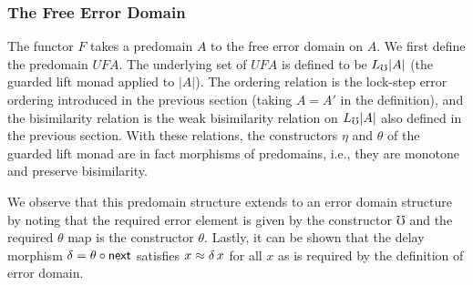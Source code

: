 \begin{comment}
    \inferrule*[right = DnClosed]
    {b_1' \le_{B_1} b_1 \and b_1 \mathbin{d \relcomp d'} b_3}
    {b_1' \mathbin{d \relcomp d'} b_3}

    \inferrule*[right = UpClosed]
    {b_1 \mathbin{d \relcomp d'} b_3 \and b_3 \le_{B_3} b_3'}
    {b_1 \mathbin{d \relcomp d'} b_3'}

    \inferrule*[right = PresErr]
    { }
    {\mho_{B_1} \mathbin{d \relcomp d'} b_3}

    \inferrule*[right = PresTheta]
    {\later_t( \tilde{b_1} \mathbin{d \relcomp d'} \tilde{b_3} ) }
    {\theta_{B_1}(\tilde{b_1}) \mathbin{d \relcomp d'} \theta_{B_3}(\tilde{b_3}) }
\end{mathpar}
%
%



We now describe the squares. Suppose we are given predomains $A_i, A_o, A_i'$,
and $A_o'$, relations $c_i : A_i \rel A_i'$ and $c_o : A_o \rel A_o'$, and
morphisms $f : A_i \to A_o, f' : A_i' \to A_o'$ Given a square with these
morphisms and relations, we say that the square commutes, written $f \le f'$, if
for all $x \in A_i$ and $x' \in A_i'$ with $(x, x') \in c_i$, we have $(f(x),
f'(x')) \in c_o$. We make the analogous definition for error domains.

\end{comment}

\subsubsection{The Free Error Domain}\label{sec:free-error-domain}

The functor $F$ takes a predomain $A$ to the free error domain on $A$. We first
define the predomain $UFA$. The underlying set of $UFA$ is defined to be $L_\mho
|A|$ (the guarded lift monad applied to $|A|$). The ordering relation is the
lock-step error ordering introduced in the previous section (taking $A = A'$ in
the definition), and the bisimilarity relation is the weak bisimilarity relation
on $L_\mho |A|$ also defined in the previous section. With these relations, the
constructors $\eta$ and $\theta$ of the guarded lift monad are in fact morphisms
of predomains, i.e., they are monotone and preserve bisimilarity.

We observe that this predomain structure extends to an error domain structure by
noting that the required error element is given by the constructor $\mho$ and
the required $\theta$ map is the constructor $\theta$. Lastly, it can be shown
that the delay morphism $\delta = \theta \circ \mathsf{next}$ satisfies $x \approx
\delta\, x$ for all $x$ as is required by the definition of error domain.

